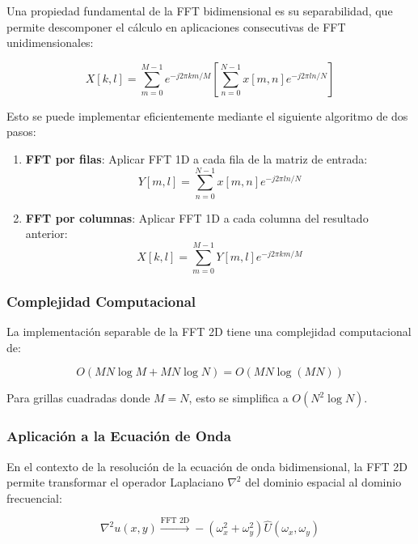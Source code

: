 \documentclass[a4paper]{article}
\begin{document}
Una propiedad fundamental de la FFT bidimensional es su separabilidad, que permite descomponer el cálculo en aplicaciones consecutivas
de FFT unidimensionales:

\begin{equation}
    X[k,l] = \sum_{m=0}^{M-1} e^{-j2\pi km/M} \left[ \sum_{n=0}^{N-1} x[m,n] e^{-j2\pi ln/N} \right]
\end{equation}

Esto se puede implementar eficientemente mediante el siguiente algoritmo de dos pasos:

\begin{enumerate}
    \item \textbf{FFT por filas}: Aplicar FFT 1D a cada fila de la matriz de entrada:
          \begin{equation}
              Y[m,l] = \sum_{n=0}^{N-1} x[m,n] e^{-j2\pi ln/N}
          \end{equation}

    \item \textbf{FFT por columnas}: Aplicar FFT 1D a cada columna del resultado anterior:
          \begin{equation}
              X[k,l] = \sum_{m=0}^{M-1} Y[m,l] e^{-j2\pi km/M}
          \end{equation}
\end{enumerate}

\subsubsection{Complejidad Computacional}

La implementación separable de la FFT 2D tiene una complejidad computacional de:

\begin{equation}
    O(MN \log M + MN \log N) = O(MN \log(MN))
\end{equation}

Para grillas cuadradas donde $M = N$, esto se simplifica a $O(N^2 \log N)$.

\subsubsection{Aplicación a la Ecuación de Onda}

En el contexto de la resolución de la ecuación de onda bidimensional, la FFT 2D permite transformar el operador Laplaciano $\nabla^2$
del dominio espacial al dominio frecuencial:

\begin{equation}
    \nabla^2 u(x,y) \xrightarrow{\text{FFT 2D}} -(\omega_x^2 + \omega_y^2) \hat{U}(\omega_x, \omega_y)
\end{equation}
\end{document}
